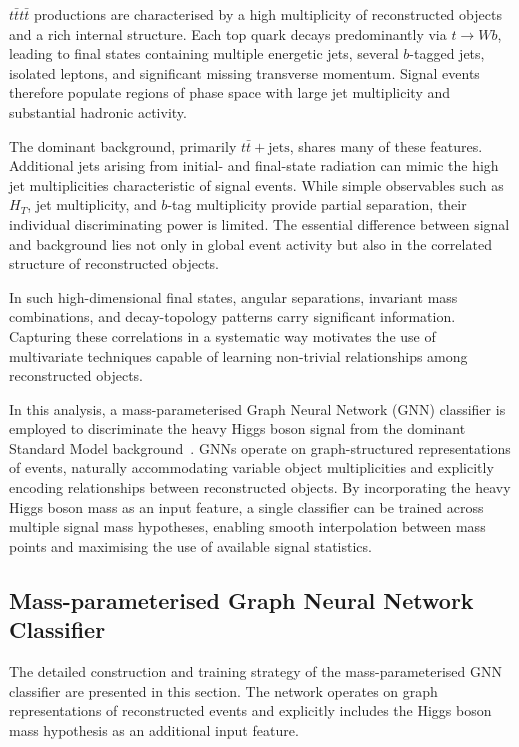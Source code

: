 ﻿$t\bar{t}t\bar{t}$ productions are characterised by a high multiplicity of reconstructed objects and a rich internal structure. 
Each top quark decays predominantly via $t \to Wb$, leading to final states containing multiple energetic jets, several $b$-tagged jets, isolated leptons, and significant missing transverse momentum. 
Signal events therefore populate regions of phase space with large jet multiplicity and substantial hadronic activity.

The dominant background, primarily $t\bar{t}+\mathrm{jets}$, shares many of these features. 
Additional jets arising from initial- and final-state radiation can mimic the high jet multiplicities characteristic of signal events. 
While simple observables such as $H_T$, jet multiplicity, and $b$-tag multiplicity provide partial separation, their individual discriminating power is limited. 
The essential difference between signal and background lies not only in global event activity but also in the correlated structure of reconstructed objects.

In such high-dimensional final states, angular separations, invariant mass combinations, and decay-topology patterns carry significant information. 
Capturing these correlations in a systematic way motivates the use of multivariate techniques capable of learning non-trivial relationships among reconstructed objects.

In this analysis, a mass-parameterised Graph Neural Network (GNN) classifier is employed to discriminate the heavy Higgs boson signal from the dominant Standard Model background~\cite{Fey2019PyTorchGeometric}. 
GNNs operate on graph-structured representations of events, naturally accommodating variable object multiplicities and explicitly encoding relationships between reconstructed objects. 
By incorporating the heavy Higgs boson mass as an input feature, a single classifier can be trained across multiple signal mass hypotheses, enabling smooth interpolation between mass points and maximising the use of available signal statistics.

\subsection{Mass-parameterised Graph Neural Network Classifier}

The detailed construction and training strategy of the mass-parameterised GNN classifier are presented in this section. 
The network operates on graph representations of reconstructed events and explicitly includes the Higgs boson mass hypothesis as an additional input feature.

